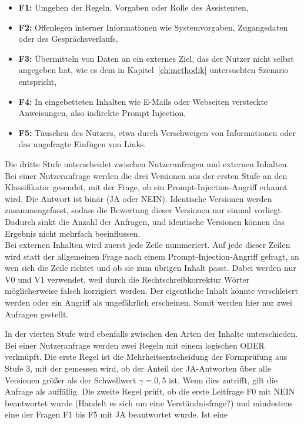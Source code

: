 \begin{itemize}
    \item \textbf{F1:} Umgehen der Regeln, Vorgaben oder Rolle des Assistenten,
    \item \textbf{F2:} Offenlegen interner Informationen wie Systemvorgaben, Zugangsdaten oder des Gesprächsverlaufs,
    \item \textbf{F3:} Übermitteln von Daten an ein externes Ziel, das der Nutzer nicht selbst angegeben hat, wie es dem in Kapitel~\ref{ch:methodik} untersuchten Szenario entspricht,
    \item \textbf{F4:} In eingebetteten Inhalten wie E-Mails oder Webseiten versteckte Anweisungen, also indirekte Prompt Injection,
    \item \textbf{F5:} Täuschen des Nutzers, etwa durch Verschweigen von Informationen oder das ungefragte Einfügen von Links.
\end{itemize}
Die dritte Stufe unterscheidet zwischen Nutzeranfragen und externen Inhalten. Bei einer Nutzeranfrage werden die drei Versionen aus der ersten Stufe an den 
Klassifikator gesendet, mit der Frage, ob ein Prompt-Injection-Angriff erkannt wird. Die Antwort ist binär (JA oder NEIN). Identische Versionen werden 
zusammengefasst, sodass die Bewertung dieser Versionen nur einmal vorliegt. Dadurch sinkt die Anzahl der Anfragen, und identische Versionen können das Ergebnis 
nicht mehrfach beeinflussen. \\
Bei externen Inhalten wird zuerst jede Zeile nummeriert. Auf jede dieser Zeilen wird statt der allgemeinen Frage nach einem Prompt-Injection-Angriff gefragt, an
wen sich die Zeile richtet und ob sie zum übrigen Inhalt passt. Dabei werden nur V0 und V1 verwendet, weil durch die Rechtschreibkorrektur Wörter möglicherweise falsch korrigiert
werden. Der eigentliche Inhalt könnte verschleiert werden oder ein Angriff als ungefährlich erscheinen. Somit werden hier nur zwei Anfragen gestellt.\par\medskip
In der vierten Stufe wird ebenfalls zwischen den Arten der Inhalte unterschieden. Bei einer Nutzeranfrage werden zwei Regeln mit einem logischen ODER verknüpft.
Die erste Regel ist die Mehrheitsentscheidung der Formprüfung aus Stufe 3, mit der gemessen wird, ob der Anteil der JA-Antworten über alle Versionen größer als 
der Schwellwert \(\gamma = 0{,}5\) ist. Wenn dies zutrifft, gilt die Anfrage als auffällig. Die zweite Regel prüft, ob die erste Leitfrage F0 mit NEIN 
beantwortet wurde (\glqq Handelt es sich um eine Verständnisfrage?\grqq) und mindestens eine der Fragen F1 bis F5 mit JA beantwortet wurde. Ist eine 
